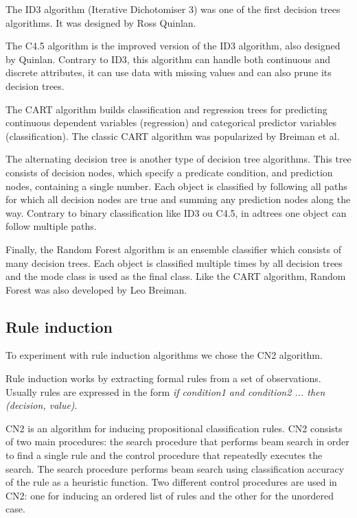 \documentclass[a4paper]{llncs}
\begin{document}
The ID3 algorithm (Iterative Dichotomiser 3) was one of the first decision trees algorithms.
It was designed by Ross Quinlan.

The C4.5 algorithm is the improved version of the ID3 algorithm, also designed by Quinlan.
Contrary to ID3, this algorithm can handle both continuous and discrete attributes,
it can use data with missing values and can also prune its decision trees.

The CART algorithm builds classification and regression trees for predicting continuous dependent variables (regression)
and categorical predictor variables (classification). The classic CART algorithm was popularized by Breiman et al. \cite{cart}

The alternating decision tree is another type of decision tree algorithms. This tree
consists of decision nodes, which specify a predicate condition, and prediction nodes, containing a single number.
Each object is classified by following all paths for which all decision nodes are true and summing any
prediction nodes along the way. Contrary to binary classification like ID3 ou C4.5, in adtrees one
object can follow multiple paths. 

Finally, the Random Forest algorithm is an ensemble classifier which consists of many decision trees.
Each object is classified multiple times by all decision trees and the mode class is used as the final class.
Like the CART algorithm, Random Forest was also developed by Leo Breiman.

\subsection{Rule induction}

To experiment with rule induction algorithms we chose the CN2 \cite{cn2} algorithm.

Rule induction works by extracting formal rules from a set of observations.
Usually rules are expressed in the form \textit{if condition1 and condition2 ... then (decision, value)}.

CN2 is an algorithm for inducing 
propositional classification rules. CN2 consists of two main procedures: the 
search procedure that performs beam search in order to find a single rule and 
the control procedure that repeatedly executes the search. 
The search procedure performs beam search using classification accuracy 
of the rule as a heuristic function.
Two different control procedures are used in CN2: one for inducing an ordered 
list of rules and the other for the unordered case.
\end{document}
